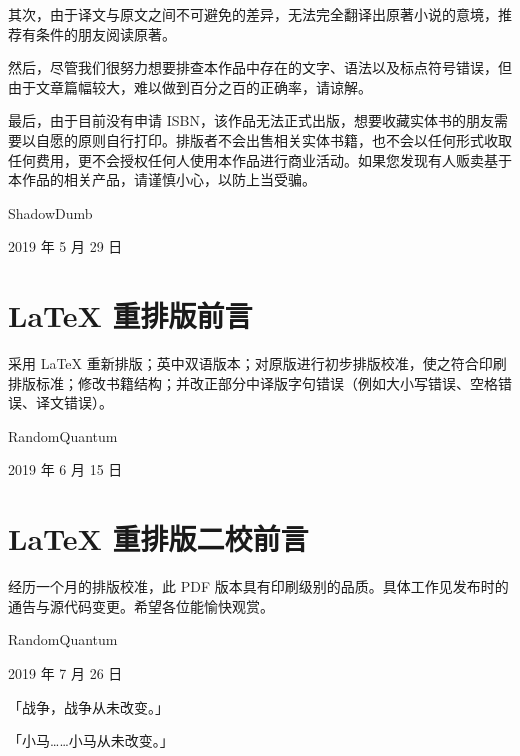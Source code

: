 其次，由于译文与原文之间不可避免的差异，无法完全翻译出原著小说的意境，推荐有条件的朋友阅读原著。

然后，尽管我们很努力想要排查本作品中存在的文字、语法以及标点符号错误，但由于文章篇幅较大，难以做到百分之百的正确率，请谅解。

最后，由于目前没有申请 ISBN，该作品无法正式出版，想要收藏实体书的朋友需要以自愿的原则自行打印。排版者不会出售相关实体书籍，也不会以任何形式收取任何费用，更不会授权任何人使用本作品进行商业活动。如果您发现有人贩卖基于本作品的相关产品，请谨慎小心，以防上当受骗。

\begin{flushright}
ShadowDumb

2019 年 5 月 29 日
\end{flushright}

\clearpage

\section*{\LaTeX{} 重排版前言}

采用 \LaTeX{} 重新排版；英中双语版本；对原版进行初步排版校准，使之符合印刷排版标准；修改书籍结构；并改正部分中译版字句错误（例如大小写错误、空格错误、译文错误）。

\begin{flushright}
RandomQuantum

2019 年 6 月 15 日
\end{flushright}

\section*{\LaTeX{} 重排版二校前言}

经历一个月的排版校准，此 PDF 版本具有印刷级别的品质。具体工作见发布时的通告与源代码变更。希望各位能愉快观赏。

\begin{flushright}
RandomQuantum

2019 年 7 月 26 日
\end{flushright}

\begin{motto}
「战争，战争从未改变。」

\medskip

「小马……小马从未改变。」
\end{motto}

